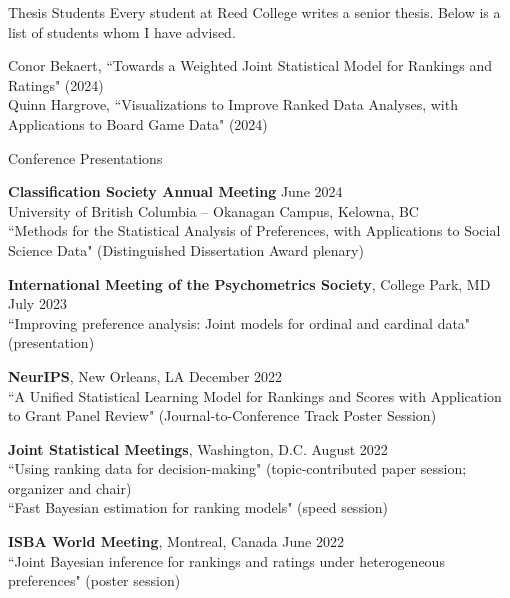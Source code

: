 \documentclass{resume} %
\begin{document}
\begin{rSection}{Thesis Students}
Every student at Reed College writes a senior thesis. Below is a list of students whom I have advised.

Conor Bekaert, ``Towards a Weighted Joint Statistical Model for Rankings and Ratings" (2024)
\\ Quinn Hargrove, ``Visualizations to Improve Ranked Data Analyses, with Applications to Board Game Data" (2024)

\end{rSection}

\begin{rSection}{Conference Presentations}

\textbf{Classification Society Annual Meeting} \hfill{June 2024}\\
University of British Columbia -- Okanagan Campus, Kelowna, BC \\
``Methods for the Statistical Analysis of Preferences, with Applications to Social Science Data" (Distinguished Dissertation Award plenary)

\textbf{International Meeting of the Psychometrics Society}, College Park, MD \hfill{July 2023}\\
``Improving preference analysis: Joint models for ordinal and cardinal data" (presentation)

\textbf{NeurIPS}, New Orleans, LA \hfill {December 2022}\\
``A Unified Statistical Learning Model for Rankings and Scores with Application to Grant Panel Review" (Journal-to-Conference Track Poster Session)

\textbf{Joint Statistical Meetings}, Washington, D.C. \hfill {August 2022}\\
``Using ranking data for decision-making" (topic-contributed paper session; organizer and chair)\\
``Fast Bayesian estimation for ranking models" (speed session)

\textbf{ISBA World Meeting}, Montreal, Canada \hfill {June 2022}\\
``Joint Bayesian inference for rankings and ratings under heterogeneous preferences" (poster session)



\end{rSection}
\end{document}
